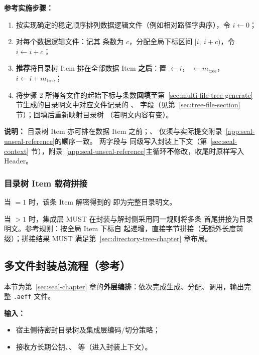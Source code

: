 \textbf{参考实施步骤：}
\begin{enumerate}
  \item 按实现确定的稳定顺序排列数据逻辑文件（例如相对路径字典序），令 $i \leftarrow 0$；
  \item 对每个数据逻辑文件：记其  条数为 $c$，分配全局下标区间 $[i,\ i+c)$，令 $i \leftarrow i + c$；
  \item \textbf{推荐}将目录树 Item 排在全部数据 Item \textbf{之后}：置  $\leftarrow i$， $\leftarrow m_{\mathrm{tree}}$，$i \leftarrow i + m_{\mathrm{tree}}$；
  \item 将步骤 2 所得各文件的起始下标与条数\textbf{回填}至第~\ref{sec:multi-file-tree-generate} 节生成的目录明文中对应文件记录的 、 字段（见第~\ref{sec:tree-file-section} 节）；回填后重新映射目录树 （若明文内容有变）。
\end{enumerate}

\textbf{说明：}
目录树 Item 亦可排在数据 Item 之前；、 仅须与实际提交附录~\ref{app:seal-unseal-reference}的顺序一致。 两字段与  同级写入封装上下文（第~\ref{sec:seal-context} 节），附录~\ref{app:seal-unseal-reference}主循环\textbf{不}修改，收尾时原样写入 Header。

\subsubsection{目录树 Item 载荷拼接}\label{sec:multi-file-tree-payload-concat}

当  $= 1$ 时，该条 Item 解密得到的  即为完整目录明文。

当  $> 1$ 时，集成层 MUST 在封装与解封侧采用同一规则将多条  首尾拼接为目录明文。参考规则：按全局 Item 下标自  起递增，直接字节拼接（\textbf{无}额外长度前缀）；拼接结果 MUST 满足第~\ref{sec:directory-tree-chapter} 章布局。

\subsection{多文件封装总流程（参考）}\label{sec:multi-file-seal-flow}

本节为第~\ref{sec:seal-chapter} 章的\textbf{外层编排}：依次完成生成、分配、调用，输出完整 \texttt{.aeff} 文件。

\textbf{输入：}
\begin{itemize}
  \item 宿主侧待密封目录树及集成层编码/切分策略；
  \item 接收方长期公钥、、 等（进入封装上下文）。
\end{itemize}

